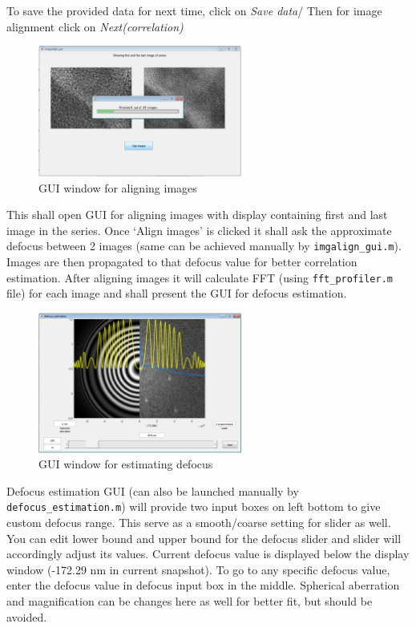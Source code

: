 To save the provided data for next time, click on \textit{Save data}/
Then for image alignment click on \textit{Next(correlation)}

\begin{figure}
    \centering
    \includegraphics[width=0.6\textwidth]{figures/imalign.pdf}
    \caption{GUI window for aligning images}
    \label{fig:imalign}
\end{figure}

This shall open GUI for aligning images with display containing first and last image in the series.
Once `Align images' is clicked it shall ask the approximate defocus between 2 images (same can be achieved manually by \texttt{imgalign\_gui.m}).
Images are then propagated to that defocus value for better correlation estimation.\cite{meyer_symmetric}
After aligning images it will calculate FFT (using \texttt{fft\_profiler.m} file) for each image and shall present the GUI for defocus estimation.

\begin{figure}
    \centering
    \includegraphics[width=0.6\textwidth]{figures/defocusgui.pdf}
    \caption{GUI window for estimating defocus}
    \label{fig:defocusest}
\end{figure}

Defocus estimation GUI (can also be launched manually by \texttt{defocus\_estimation.m}) will provide two input boxes on left bottom to give custom defocus range.
This serve as a smooth/coarse setting for slider as well.
You can edit lower bound and upper bound for the defocus slider and slider will accordingly adjust its values.
Current defocus value is displayed below the display window (-172.29 nm in current snapshot).
To go to any specific defocus value, enter the defocus value in defocus input box in the middle.
Spherical aberration and magnification can be changes here as well for better fit, but should be avoided.

